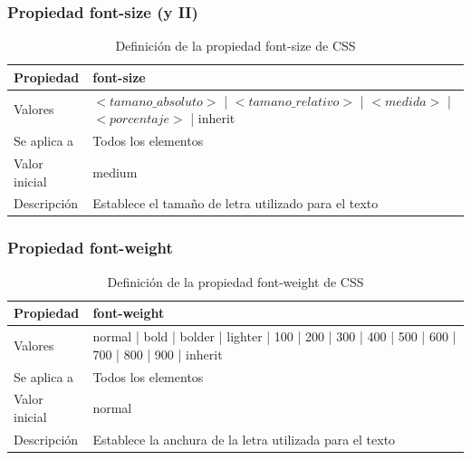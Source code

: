 
\begin{frame}
\frametitle{Propiedad font-size (y II)}

\begin{center}
  \begin{table}
   \begin{tabular}{p{1.8cm}p{7.8cm}}
Propiedad & \bf{font-size} \\ \hline
Valores & $<tamano\_absoluto>$ | $<tamano\_relativo>$ | $<medida>$ | $<porcentaje>$ | inherit \\ \hline
Se aplica a & Todos los elementos \\ \hline
Valor inicial & medium \\ \hline
Descripción & Establece el tamaño de letra utilizado para el texto \\ \hline
  \end{tabular}
   \caption{Definición de la propiedad font-size de CSS}
 \end{table}
\end{center}

\end{frame}



\begin{frame}
\frametitle{Propiedad font-weight}

\begin{center}
  \begin{table}
   \begin{tabular}{p{1.8cm}p{7.8cm}}
Propiedad & \bf{font-weight} \\ \hline
Valores& normal | bold | bolder | lighter | 100 | 200 | 300 | 400 | 500 | 600 | 700 | 800 | 900 | inherit \\ \hline
Se aplica a& Todos los elementos \\ \hline
Valor inicial& normal \\ \hline
Descripción& Establece la anchura de la letra utilizada para el texto \\ \hline
  \end{tabular}
   \caption{Definición de la propiedad font-weight de CSS}
 \end{table}
\end{center}


\end{frame}



